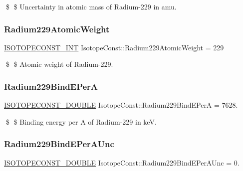 \$ \$ Uncertainty in atomic mass of Radium-\/229 in amu. \mbox{\label{group___isotope_const-_radium-_ra229_gafe234b74416555d18ff97921ebd40f95}} 
\subsubsection{\texorpdfstring{Radium229\+Atomic\+Weight}{Radium229AtomicWeight}}
{\footnotesize\ttfamily \mbox{\hyperlink{group___isotope_const-_macros_ga5f18360b3e99483a35c32d789e62621c}{I\+S\+O\+T\+O\+P\+E\+C\+O\+N\+S\+T\+\_\+\+I\+NT}} Isotope\+Const\+::\+Radium229\+Atomic\+Weight = 229}

\$ \$ Atomic weight of Radium-\/229. \mbox{\label{group___isotope_const-_radium-_ra229_gac808c22840cc343fa08357ace76bdce8}} 
\subsubsection{\texorpdfstring{Radium229\+Bind\+E\+PerA}{Radium229BindEPerA}}
{\footnotesize\ttfamily \mbox{\hyperlink{group___isotope_const-_macros_ga8f45a7272ce02c0b4c65c44636ed719a}{I\+S\+O\+T\+O\+P\+E\+C\+O\+N\+S\+T\+\_\+\+D\+O\+U\+B\+LE}} Isotope\+Const\+::\+Radium229\+Bind\+E\+PerA = 7628.}

\$ \$ Binding energy per A of Radium-\/229 in keV. \mbox{\label{group___isotope_const-_radium-_ra229_ga51cab1b82cd644eab75186a63a637898}} 
\subsubsection{\texorpdfstring{Radium229\+Bind\+E\+Per\+A\+Unc}{Radium229BindEPerAUnc}}
{\footnotesize\ttfamily \mbox{\hyperlink{group___isotope_const-_macros_ga8f45a7272ce02c0b4c65c44636ed719a}{I\+S\+O\+T\+O\+P\+E\+C\+O\+N\+S\+T\+\_\+\+D\+O\+U\+B\+LE}} Isotope\+Const\+::\+Radium229\+Bind\+E\+Per\+A\+Unc = 0.}

